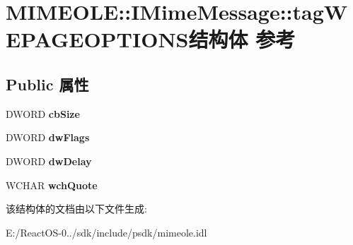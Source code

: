\hypertarget{struct_m_i_m_e_o_l_e_1_1_i_mime_message_1_1tag_w_e_p_a_g_e_o_p_t_i_o_n_s}{}\section{M\+I\+M\+E\+O\+LE\+:\+:I\+Mime\+Message\+:\+:tag\+W\+E\+P\+A\+G\+E\+O\+P\+T\+I\+O\+N\+S结构体 参考}
\label{struct_m_i_m_e_o_l_e_1_1_i_mime_message_1_1tag_w_e_p_a_g_e_o_p_t_i_o_n_s}
\subsection*{Public 属性}
\begin{DoxyCompactItemize}
\item 
\mbox{\label{struct_m_i_m_e_o_l_e_1_1_i_mime_message_1_1tag_w_e_p_a_g_e_o_p_t_i_o_n_s_a9fe0531f9b18c1f96cf1d92bd63a8784}} 
D\+W\+O\+RD {\bfseries cb\+Size}
\item 
\mbox{\label{struct_m_i_m_e_o_l_e_1_1_i_mime_message_1_1tag_w_e_p_a_g_e_o_p_t_i_o_n_s_ac10932de63c140064458af98164f531c}} 
D\+W\+O\+RD {\bfseries dw\+Flags}
\item 
\mbox{\label{struct_m_i_m_e_o_l_e_1_1_i_mime_message_1_1tag_w_e_p_a_g_e_o_p_t_i_o_n_s_ae296e849fbc0c238f4e2ae586b72f4b3}} 
D\+W\+O\+RD {\bfseries dw\+Delay}
\item 
\mbox{\label{struct_m_i_m_e_o_l_e_1_1_i_mime_message_1_1tag_w_e_p_a_g_e_o_p_t_i_o_n_s_a5bfaeed428731718a7fe7e5c75974feb}} 
W\+C\+H\+AR {\bfseries wch\+Quote}
\end{DoxyCompactItemize}


该结构体的文档由以下文件生成\+:\begin{DoxyCompactItemize}
\item 
E\+:/\+React\+O\+S-\/0../sdk/include/psdk/mimeole.\+idl\end{DoxyCompactItemize}
